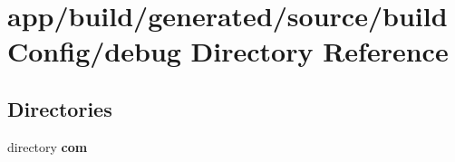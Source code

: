 \section{app/build/generated/source/build\+Config/debug Directory Reference}
\label{dir_d4ae096ba7e1037de1f6edd5ca2eb41a}
\subsection*{Directories}
\begin{DoxyCompactItemize}
\item 
directory {\bf com}
\end{DoxyCompactItemize}

